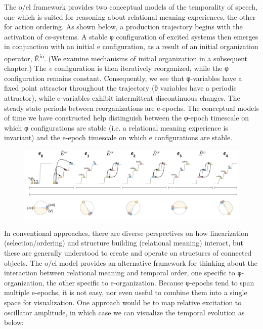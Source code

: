 The o/el framework provides two conceptual models of the temporality of speech, one which is suited for reasoning about relational meaning experiences, the other for action ordering. As shown below, a production trajectory begins with the activation of cs-systems. A stable φ configuration of excited systems then emerges in conjunction with an initial e configuration, as a result of an initial organization operator, Ê\textsuperscript{io}. (We examine mechanisms of initial organization in a subsequent chapter.) The \textit{e} configuration is then iteratively reorganized, while the φ configuration remains constant. Consequently, we see that φ-variables have a fixed point attractor throughout the trajectory (θ variables have a periodic attractor), while e-variables exhibit intermittent discontinuous changes. The steady state periods between reorganizations are e-epochs. The conceptual models of time we have constructed help distinguish between the φ-epoch timescale on which φ configurations are stable (i.e. a relational meaning experience is invariant) and the e-epoch timescale on which e configurations are stable.

  
\begin{figure}
\includegraphics[width=\textwidth]{figures/Tilsen-img27.png}
\caption{\missingcaption}
\label{fig:}
\end{figure}
 

  In conventional approaches, there are diverse perspectives on how linearization (selection/ordering) and structure building (relational meaning) interact, but these are generally understood to create and operate on structures of connected objects. The o/el model provides an alternative framework for thinking about the interaction between relational meaning and temporal order, one specific to φ-organization, the other specific to e-organization. Because φ-epochs tend to span multiple e-epochs, it is not easy, nor even useful to combine them into a single space for visualization. One approach would be to map relative excitation to oscillator amplitude, in which case we can visualize the temporal evolution as below:

